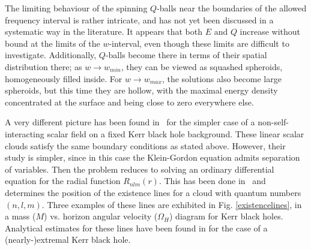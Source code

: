 The limiting behaviour of the spinning $Q$-balls near the boundaries of the allowed frequency interval
is rather intricate, and has not yet been discussed in a systematic way  in the literature. 
It appears that 
both $E$ and $Q$
increase without bound at the limits of the $w$-interval, even though these limits are difficult to investigate.
Additionally, $Q$-balls become there in terms of their spatial distribution there;
as $w\to w_{min}$,
they can be viewed as squashed spheroids, homogeneously filled inside.
For $w\to w_{max}$, the solutions
also become large spheroids, but this time they are hollow, with the maximal energy density
concentrated at the surface and being close to zero everywhere else.  

\bigskip
  
A very different picture has been found in~\cite{Herdeiro:2014goa,Benone:2014ssa}
for the simpler case of a non-self-interacting
scalar field
on a fixed Kerr black hole background.
These linear scalar clouds
satisfy the same boundary conditions as stated above.
However, their study is  simpler, since in this case
the Klein-Gordon equation admits separation of variables. 
%
Then the problem reduces to solving
an ordinary differential equation for 
the radial function $R_{nlm}(r)$.
This has been done in~\cite{Herdeiro:2014goa,Benone:2014ssa} and determines the position of the existence lines for a cloud with quantum numbers $(n,l,m)$. Three examples of these lines are exhibited in Fig. \ref{existencelines}, in a mass ($M$) vs. horizon angular velocity ($\Omega_H$) diagram for Kerr black holes.
%
Analytical estimates for these lines have been found in 
\cite{Hod:2012px,Hod:2013zza}
for the case of a (nearly-)extremal Kerr black hole.


